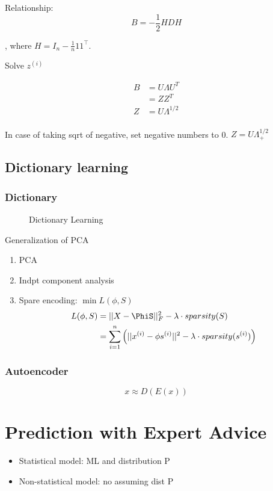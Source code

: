 \documentclass[a4paper]{report}
\begin{document}
Relationship:
$$
B = -\frac{1}{2} HDH
$$

, where $H=I_n - \frac{1}{n}11^\top$.

Solve $z^{(i)}$

\begin{align*}
B &= U\Lambda U^T \\
&= ZZ^T \\
Z &= U\Lambda^{1/2} \\
\end{align*}

In case of taking sqrt of negative, set negative numbers to 0. $Z=U\Lambda_+^{1/2}$
\section{Dictionary learning}
\subsection{Dictionary}
\begin{figure}[!htp]
\centering
{}
\caption{Dictionary Learning}
\label{fig:dicLearn}
\end{figure}

Generalization of PCA
\begin{enumerate}
\item PCA
\item Indpt component analysis
\item Spare encoding: $\min L(\phi, S) $
\begin{align*}
L(\phi, S) &= ||X-\PhiS||_F^2 - \lambda\cdot sparsity(S) \\
&= \sum_{i=1}^n \Big(||x^{(i)}-\phi s^{(i)}||^2-\lambda\cdot sparsity(s^{(i)})\Big)
\end{align*}
\end{enumerate}

\subsection{Autoencoder}
$$
x \approx D(E(x))
$$

\chapter{Prediction with Expert Advice}
\begin{itemize}
\item Statistical model: ML and distribution P
\item Non-statistical model: no assuming dist P
\end{itemize}
\end{document}
